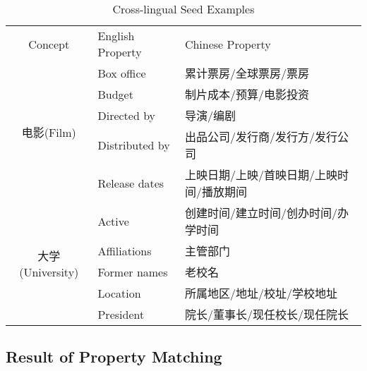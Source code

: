 \documentclass[runningheads,a4paper]{llncs}
\begin{document}
\begin{table}[htb]
  \centering
  \caption{Cross-lingual Seed Examples}
  \label{tab:cross-lingual-seed-examples}
    \begin{tabular}{cll}
      {Concept} & {English Property} &  {Chinese Property} \\
      \multirow{5}{*}{电影(Film)}
      & Box office     & 累计票房/全球票房/票房  \\
      & Budget         & 制片成本/预算/电影投资  \\
      & Directed by    & 导演/编剧                        \\
      & Distributed by & 出品公司/发行商/发行方/发行公司  \\
      & Release dates  & 上映日期/上映/首映日期/上映时间/播放期间  \\
      \multirow{5}{*}{大学(University)}
      & Active       & 创建时间/建立时间/创办时间/办学时间  \\
      & Affiliations & 主管部门  \\
      & Former names & 老校名  \\
      & Location     & 所属地区/地址/校址/学校地址  \\
      & President    & 院长/董事长/现任校长/现任院长 \\
    \end{tabular}
\end{table}

\subsection{Result of Property Matching}

%
%
%
\end{document}
